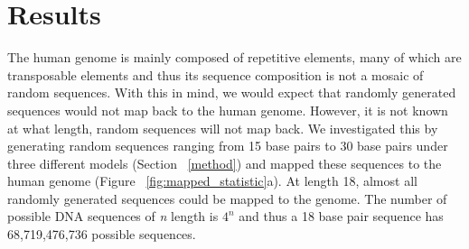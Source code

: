 \documentclass{article}
\begin{document}
\section{Results}\label{result}

The human genome is mainly composed of repetitive elements, many of which are transposable elements and thus its sequence composition is not a mosaic of random sequences. With this in mind, we would expect that randomly generated sequences would not map back to the human genome. However, it is not known at what length, random sequences will not map back. We investigated this by generating random sequences ranging from 15 base pairs to 30 base pairs under three different models (Section ~\ref{method}) and mapped these sequences to the human genome (Figure ~\ref{fig:mapped_statistic}a). At length 18, almost all randomly generated sequences could be mapped to the genome. The number of possible DNA sequences of \textit{n} length is $4^{n}$ and thus a 18 base pair sequence has 68,719,476,736 possible sequences.
\end{document}
